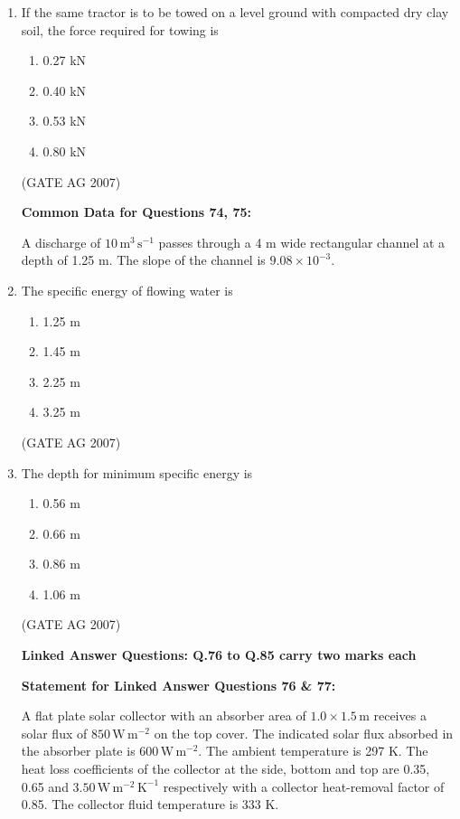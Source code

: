 \documentclass[journal,12pt,onecolumn]{IEEEtran}
\theoremstyle{remark}
\begin{document}
\begin{enumerate}
\item If the same tractor is to be towed on a level ground with compacted dry clay soil, the force required for towing is
\begin{multicols}{4}
\begin{enumerate}
    \item 0.27 kN
    \item 0.40 kN
    \item 0.53 kN
    \item 0.80 kN
\end{enumerate}
\end{multicols}
\hfill(GATE AG 2007)

\textbf{Common Data for Questions 74, 75:}


A discharge of $10 \, \text{m}^3 \, \text{s}^{-1}$ passes through a 4 m wide rectangular channel at a depth of 1.25 m. The slope of the channel is $9.08 \times 10^{-3}$.


\item The specific energy of flowing water is
\begin{multicols}{4}
\begin{enumerate}
\item 1.25 m
\item 1.45 m
\item 2.25 m
\item 3.25 m
\end{enumerate}
\end{multicols}
\hfill(GATE AG 2007)

\item The depth for minimum specific energy is
\begin{multicols}{4}
\begin{enumerate}
\item 0.56 m
\item 0.66 m
\item 0.86 m
\item 1.06 m
\end{enumerate}
\end{multicols}
\hfill(GATE AG 2007)
 
\textbf{Linked Answer Questions: Q.76 to Q.85 carry two marks each}


\textbf{Statement for Linked Answer Questions 76 \& 77:}

A flat plate solar collector with an absorber area of $1.0 \times 1.5 \, \text{m}$ receives a solar flux of $850 \, \text{W} \, \text{m}^{-2}$ on the top cover. The indicated solar flux absorbed in the absorber plate is $600 \, \text{W} \, \text{m}^{-2}$. The ambient temperature is 297 K. The heat loss coefficients of the collector at the side, bottom and top are 0.35, 0.65 and $3.50 \, \text{W} \, \text{m}^{-2} \, \text{K}^{-1}$ respectively with a collector heat-removal factor of 0.85. The collector fluid temperature is 333 K.


\end{enumerate}
\end{document}
